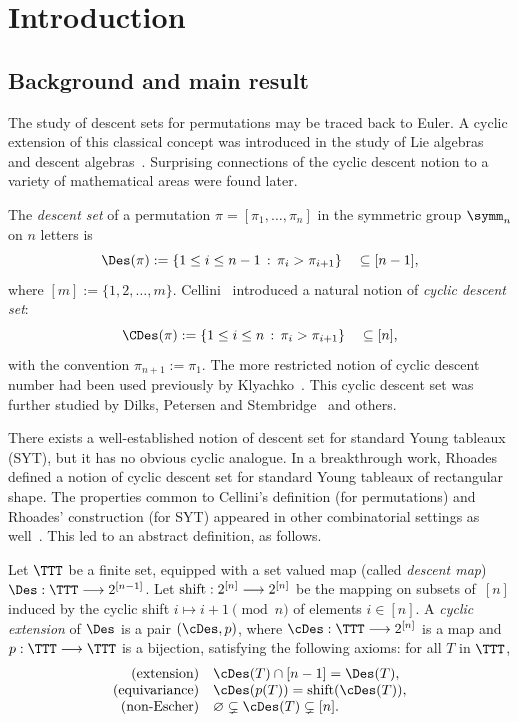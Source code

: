 \section{Introduction}

\subsection{Background and main result}

The study of descent sets for permutations may be traced back to Euler. 
A cyclic extension of this classical concept was introduced in the study of
Lie algebras~\cite{Klyachko} and descent algebras~\cite{Cellini}. Surprising connections of the cyclic descent
notion to a variety of mathematical areas were found later.
	
The {\em descent set} of a permutation $\pi = [\pi_1, \ldots, \pi_n]$ in the symmetric group $\symm_n$ on $n$ letters is
\[
    \Des(\pi) := \{1 \le i \le n-1 \,:\, \pi_i > \pi_{i+1} \}
    \quad \subseteq [n-1],
\]
where $[m]:=\{1,2,\ldots,m\}$.  
Cellini~\cite{Cellini} introduced a natural notion of {\em cyclic descent set}: 
\[
    \CDes(\pi) := \{1 \leq i \leq n \,:\, \pi_i > \pi_{i+1} \}
    \quad \subseteq [n],
\]
with the convention $\pi_{n+1}:=\pi_1$.  
The more restricted notion of cyclic descent number had been used previously by Klyachko~\cite{Klyachko}.
This cyclic descent set was further studied by Dilks, Petersen and Stembridge~\cite{DPS} and others.
	
There exists a well-established notion of descent set for standard Young tableaux (SYT), but it has no obvious cyclic analogue. 
In a breakthrough work, Rhoades~\cite{Rhoades} defined a notion of cyclic descent set for standard Young tableaux of rectangular shape.
The properties common to Cellini's definition (for permutations) and Rhoades' construction (for SYT) appeared in other combinatorial settings as well~\cite{PPR, Pechenik, ER, AER}.
This led to an abstract definition, as follows.
	
\begin{definition}\label{def:cDes}
Let $\TTT$ be a finite set, equipped with a set valued map (called {\em descent map}) 
$\Des: \TTT \longrightarrow 2^{[n-1]}$. 
Let ${\rm shift}: 2^{[n]} \longrightarrow 2^{[n]}$ be the mapping on subsets of~$[n]$ induced by the cyclic shift $i \mapsto i + 1 \pmod n$ of elements $i \in [n]$.
A {\em cyclic extension} of $\Des$ is
a pair $(\cDes,p)$, where 
$\cDes: \TTT \longrightarrow 2^{[n]}$ is a map 
and $p: \TTT \longrightarrow \TTT$ is a bijection,
satisfying the following axioms:  for all $T$ in  $\TTT$,
\[
\begin{array}{rl}
\text{(extension)}   & \cDes(T) \cap [n-1] = \Des(T),\\
\text{(equivariance)}& \cDes(p(T))  = {\rm shift}(\cDes(T)),\\
\text{(non-Escher)}  & \varnothing \subsetneq \cDes(T) \subsetneq [n].\\
\end{array}
\]
\end{definition}

